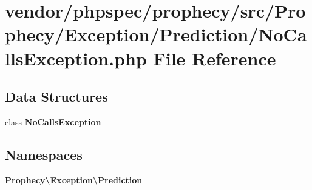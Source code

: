 \section{vendor/phpspec/prophecy/src/\+Prophecy/\+Exception/\+Prediction/\+No\+Calls\+Exception.php File Reference}
\label{_no_calls_exception_8php}
\subsection*{Data Structures}
\begin{DoxyCompactItemize}
\item 
class {\bf No\+Calls\+Exception}
\end{DoxyCompactItemize}
\subsection*{Namespaces}
\begin{DoxyCompactItemize}
\item 
 {\bf Prophecy\textbackslash{}\+Exception\textbackslash{}\+Prediction}
\end{DoxyCompactItemize}
